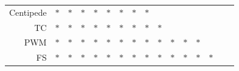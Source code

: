 \documentclass[11pt]{article}
\begin{document}
\begin{table}[h!]
\begin{center}
\begin{tabular}{ rccccccccccccccc }
    Centipede & $*$ & $*$ & $*$ & $*$ & $*$ & $*$ & $*$ & $*$ &     &     &     &     &     &     &     \\
    TC & $*$ & $*$ & $*$ & $*$ & $*$ & $*$ & $*$ & $*$ & $*$ &     &     &     &     &     &     \\
    PWM & $*$ & $*$ & $*$ & $*$ & $*$ & $*$ & $*$ & $*$ & $*$ & $*$ & $*$ & $*$ &     &     &     \\
    FS & $*$ & $*$ & $*$ & $*$ & $*$ & $*$ & $*$ & $*$ & $*$ & $*$ & $*$ & $*$ & $*$ &     &     \\
    \hline
  \end{tabular}
\end{center}
\vspace{0.0cm}
\end{table}

\clearpage
\end{document}
